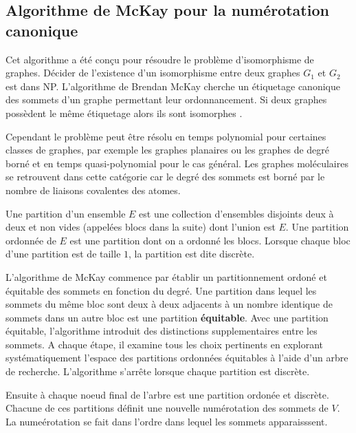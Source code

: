 \subsection{Algorithme de McKay pour la numérotation canonique}

Cet algorithme a été conçu pour résoudre le problème d'isomorphisme de graphes. Décider de l'existence d’un isomorphisme entre deux graphes $G_1$ et $G_2$ est dans NP. L'algorithme de Brendan McKay \cite{Hartke} cherche un étiquetage canonique des sommets d'un graphe permettant leur ordonnancement. Si deux graphes possèdent le même étiquetage alors ils sont isomorphes \cite{McKay201494}. 

Cependant le problème peut être résolu en temps polynomial pour certaines classes de graphes, par exemple les graphes planaires ou les graphes de degré borné et en temps quasi-polynomial pour le cas général. Les graphes moléculaires se retrouvent dans cette catégorie car le degré des sommets est borné par le nombre de liaisons covalentes des atomes.

\begin{definition}
Une partition d'un ensemble $E$ est une collection d'ensembles disjoints deux à deux et non vides (appelées blocs dans la suite) dont l'union est $E$. Une partition ordonnée de $E$ est une partition dont on a ordonné les blocs. Lorsque chaque bloc d'une partition est de taille $1$, la partition est dite discrète. 
\end{definition}

L'algorithme de McKay commence par établir un partitionnement ordoné et équitable des sommets en fonction du degré. Une partition dans lequel les sommets du même bloc sont deux à deux adjacents à un nombre identique de sommets dans un autre bloc est une partition \textbf{équitable}. Avec une partition équitable, l'algorithme introduit des distinctions supplementaires entre les sommets. A chaque étape, il examine tous les choix pertinents en explorant systématiquement l’espace des partitions ordonnées équitables à l’aide d’un arbre de recherche. L'algorithme s'arrête lorsque chaque partition est discrète. 


Ensuite à chaque noeud final de l'arbre est une partition ordonée et discrète.  Chacune de ces partitions définit une nouvelle numérotation des sommets de $V$. La numeérotation se fait dans l'ordre dans lequel les sommets apparaisssent. %

